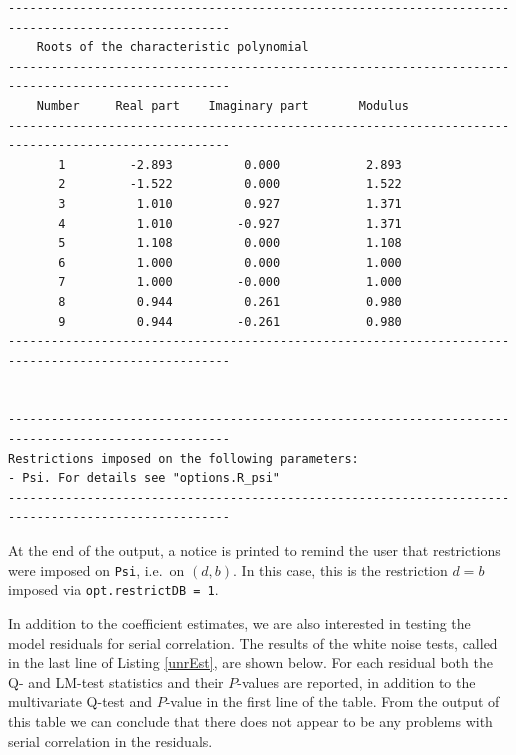 \documentclass[10pt]{article}
\begin{document}
\begin{verbatim}
-----------------------------------------------------------------------------------------------------
    Roots of the characteristic polynomial                                                           
-----------------------------------------------------------------------------------------------------
    Number     Real part    Imaginary part       Modulus                                             
-----------------------------------------------------------------------------------------------------
       1         -2.893          0.000            2.893                                        
       2         -1.522          0.000            1.522                                        
       3          1.010          0.927            1.371                                        
       4          1.010         -0.927            1.371                                        
       5          1.108          0.000            1.108                                        
       6          1.000          0.000            1.000                                        
       7          1.000         -0.000            1.000                                        
       8          0.944          0.261            0.980                                        
       9          0.944         -0.261            0.980                                        
-----------------------------------------------------------------------------------------------------


-----------------------------------------------------------------------------------------------------
Restrictions imposed on the following parameters:
- Psi. For details see "options.R_psi"
-----------------------------------------------------------------------------------------------------
\end{verbatim}

At the end of the output, a notice is printed to remind the user that restrictions were imposed on \verb|Psi|, i.e.\ on $(d,b)$. In this case, this is the restriction $d=b$ imposed via \verb|opt.restrictDB = 1|.

In addition to the coefficient estimates, we are also interested in testing the model residuals for serial correlation. The results of the white noise tests, called in the last line of Listing \ref{unrEst}, are shown below. For each residual both the Q- and LM-test statistics and their $P$-values are reported, in addition to the multivariate Q-test and $P$-value in the first line of the table. From the output of this table we can conclude that there does not appear to be any problems with serial correlation in the residuals.
\end{document}
